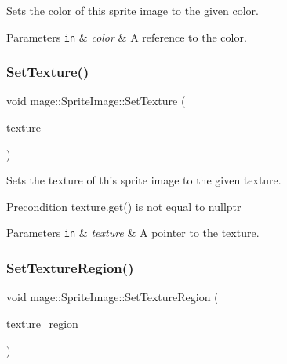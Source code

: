 Sets the color of this sprite image to the given color.


\begin{DoxyParams}[1]{Parameters}
\mbox{\tt in}  & {\em color} & A reference to the color. \\
\hline
\end{DoxyParams}
\hypertarget{classmage_1_1_sprite_image_a12e0ffecc7995f13ccf0374fa37dc4c6}{}\label{classmage_1_1_sprite_image_a12e0ffecc7995f13ccf0374fa37dc4c6} 
\subsubsection{\texorpdfstring{Set\+Texture()}{SetTexture()}}
{\footnotesize\ttfamily void mage\+::\+Sprite\+Image\+::\+Set\+Texture (\begin{DoxyParamCaption}\item[{\hyperlink{namespacemage_a1e01ae66713838a7a67d30e44c67703e}{Shared\+Ptr}$<$ \hyperlink{classmage_1_1_texture}{Texture} $>$}]{texture }\end{DoxyParamCaption})}

Sets the texture of this sprite image to the given texture.

\begin{DoxyPrecond}{Precondition}
{\ttfamily texture.\+get()} is not equal to {\ttfamily nullptr} 
\end{DoxyPrecond}

\begin{DoxyParams}[1]{Parameters}
\mbox{\tt in}  & {\em texture} & A pointer to the texture. \\
\hline
\end{DoxyParams}
\hypertarget{classmage_1_1_sprite_image_a99640fe6fc85d704f6a2831d0f663033}{}\label{classmage_1_1_sprite_image_a99640fe6fc85d704f6a2831d0f663033} 
\subsubsection{\texorpdfstring{Set\+Texture\+Region()}{SetTextureRegion()}}
{\footnotesize\ttfamily void mage\+::\+Sprite\+Image\+::\+Set\+Texture\+Region (\begin{DoxyParamCaption}\item[{const R\+E\+CT \&}]{texture\+\_\+region }\end{DoxyParamCaption})}

